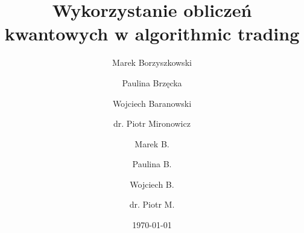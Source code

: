 \documentclass[polish,aspectratio=169]{beamer}
\title[Wykorzystanie obliczeń kwantowych w algorithmic trading]{Wykorzystanie obliczeń kwantowych w algorithmic trading}
\subtitle{}
\author{Marek Borzyszkowski \and Paulina Brzęcka \and Wojciech Baranowski \and dr. Piotr Mironowicz }
\date{\today}
\begin{document}
        
\author{Marek B. \and Paulina B. \and Wojciech B. \and dr. Piotr M. }



% 


\end{document}
